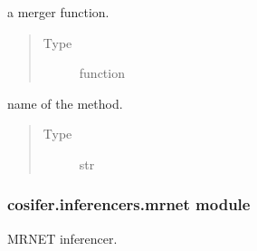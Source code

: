 \documentclass[letterpaper,10pt,english]{sphinxmanual}
\begin{document}
\begin{fulllineitems}

\begin{fulllineitems}
\label{\detokenize{_modules/cosifer.inferencers:cosifer.inferencers.jrf.JointRandomForest.merger}}
a merger function.
\begin{quote}\begin{description}
\item[{Type}] \leavevmode
function

\end{description}\end{quote}

\end{fulllineitems}


\begin{fulllineitems}
\label{\detokenize{_modules/cosifer.inferencers:cosifer.inferencers.jrf.JointRandomForest.method}}
name of the method.
\begin{quote}\begin{description}
\item[{Type}] \leavevmode
str

\end{description}\end{quote}

\end{fulllineitems}


\end{fulllineitems}



\subsubsection{cosifer.inferencers.mrnet module}
\label{\detokenize{_modules/cosifer.inferencers:module-cosifer.inferencers.mrnet}}\label{\detokenize{_modules/cosifer.inferencers:cosifer-inferencers-mrnet-module}}
MRNET inferencer.
\end{document}
